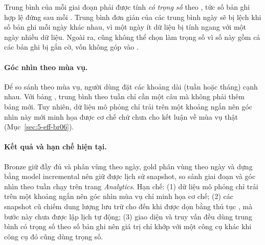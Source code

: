 Trung bình của mỗi giai đoạn phải được tính \emph{có trọng số} theo , tức số bản ghi hợp lệ đứng sau mỗi . Trung bình đơn giản của các trung bình ngày sẽ bị lệch khi số bản ghi mỗi ngày khác nhau, vì một ngày ít dữ liệu bị tính ngang với một ngày nhiều dữ liệu. Ngoài ra, cũng không thể chọn  làm trọng số vì số này gồm cả các bản ghi bị gắn cờ, vốn không góp vào .

\paragraph{Góc nhìn theo mùa vụ.} Để so sánh theo mùa vụ, người dùng đặt các khoảng dài (tuần hoặc tháng) cạnh nhau. Với bảng , trung bình theo tuần chỉ cần một câu  mà không phải thêm bảng mới. Tuy nhiên, dữ liệu mô phỏng chỉ trải trên một khoảng ngắn nên góc nhìn này mới minh họa được cơ chế chứ chưa cho kết luận về mùa vụ thật (Mục~\ref{sec:5-eff-br06}).

\paragraph{Kết quả và hạn chế hiện tại.} Bronze giữ đầy đủ và phân vùng theo ngày, gold phân vùng theo ngày và dựng bằng model incremental nên giữ được lịch sử snapshot, so sánh giai đoạn và góc nhìn theo tuần chạy trên trang \emph{Analytics}. Hạn chế: (1) dữ liệu mô phỏng chỉ trải trên một khoảng ngắn nên góc nhìn mùa vụ chỉ minh họa cơ chế; (2) các snapshot cũ chiếm dung lượng lưu trữ cho đến khi được dọn bằng thủ tục , mà bước này chưa được lập lịch tự động; (3) giao diện và truy vấn đều dùng trung bình có trọng số theo số bản ghi nên giá trị chỉ khớp với một công cụ khác khi công cụ đó cũng dùng trọng số.

